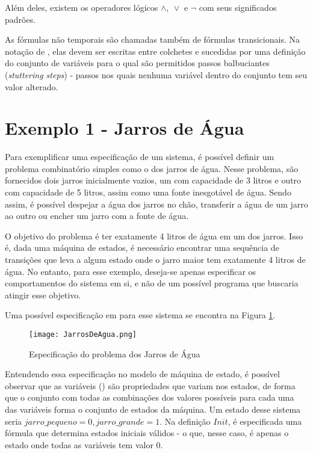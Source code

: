  Além deles, existem os operadores lógicos $\land,\ \lor$ e $\neg$ com seus significados padrões.

As fórmulas não temporais são chamadas também de fórmulas transicionais. Na notação de \TLA, elas devem ser escritas entre colchetes e sucedidas por uma definição do conjunto de variáveis para o qual são permitidos passos balbuciantes (\textit{stuttering steps}) - passos nos quais nenhuma variável dentro do conjunto tem seu valor alterado.


\section{Exemplo 1 - Jarros de Água}

Para exemplificar uma especificação de um sistema, é possível definir um problema combinatório simples como o dos jarros de água. Nesse problema, são fornecidos dois jarros inicialmente vazios, um com capacidade de 3 litros e outro com capacidade de 5 litros, assim como uma fonte inesgotável de água. Sendo assim, é possível despejar a água dos jarros no chão, transferir a água de um jarro ao outro ou encher um jarro com a fonte de água.

O objetivo do problema é ter exatamente 4 litros de água em um dos jarros. Isso é, dada uma máquina de estados, é necessário encontrar uma sequência de transições que leva a algum estado onde o jarro maior tem exatamente 4 litros de água. No entanto, para esse exemplo, deseja-se apenas especificar os comportamentos do sistema em si, e não de um possível programa que buscaria atingir esse objetivo.

Uma possível especificação em \TLA para esse sistema se encontra na Figura \ref{fig:ex1tla}.

\begin{figure}
  \centering
  \texttt{[image: JarrosDeAgua.png]}
  \caption{Especificação do problema dos Jarros de Água}
  \label{fig:ex1tla}
\end{figure}

Entendendo essa especificação no modelo de máquina de estado, é possível observar que as variáveis (\VARIABLES) são propriedades que variam nos estados, de forma que o conjunto com todas as combinações dos valores possíveis para cada uma das variáveis forma o conjunto de estados da máquina. Um estado desse sistema seria $jarro\_pequeno = 0, jarro\_grande = 1$. Na definição $Init$, é especificada uma fórmula que determina estados iniciais válidos - o que, nesse caso, é apenas o estado onde todas as variáveis tem valor 0.

